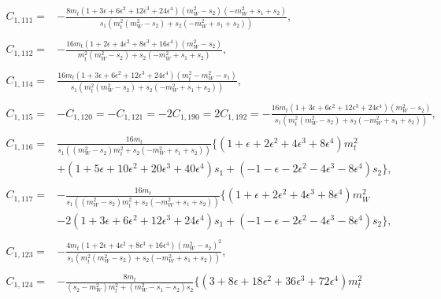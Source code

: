 \documentclass[twocolumn,aps,showpacs,nofootinbib,superscriptaddress,prd]{revtex4-2}
\begin{document}
\begin{widetext}
\begin{align}
\nonumber\\
C_{1,111}=&-\frac{8m_t\left(1 +3 \epsilon +6 \epsilon^2 +12 \epsilon^3 +24 \epsilon^4\right)\left(m_W^2-s_2\right)
\left(-m_W^2+s_1+s_2\right)}{s_1\left(m_t^2\left(m_W^2-s_2\right)+s_2\left(-m_W^2+s_1+s_2\right)\right)}
,\nonumber\\
\nonumber\\
C_{1,112}=&-\frac{16m_t\left(1 +2 \epsilon +4 \epsilon^2 +8 \epsilon^3 +16 \epsilon^4\right)\left(m_W^2-s_2\right)}{m_t^2
\left(m_W^2-s_2\right)+s_2\left(-m_W^2+s_1+s_2\right)}
,\nonumber\\
\nonumber\\
C_{1,114}=&\frac{16m_t\left(1 +3 \epsilon +6 \epsilon^2 +12 \epsilon^3 +24 \epsilon^4\right)\left(m_t^2-m_W^2-s_1\right)}{s_1\left(m_t^2
\left(m_W^2-s_2\right)+s_2\left(-m_W^2+s_1+s_2\right)\right)}
,\nonumber\\
\nonumber\\
C_{1,115}=&-C_{1,120}=-C_{1,121}=-2C_{1,190}=2C_{1,192}=-\frac{16m_t\left(1 +3 \epsilon +6 \epsilon^2 +12 \epsilon^3 +24 \epsilon^4\right)\left(m_W^2-s_2\right)}{s_1\left(m_t^2
\left(m_W^2-s_2\right)+s_2\left(-m_W^2+s_1+s_2\right)\right)}
,\nonumber\\
\nonumber\\
C_{1,116}=&\frac{16m_t}{s_1\left(\left(m_W^2-s_2\right)m_t^2+s_2\left(-m_W^2+s_1+s_2\right)\right)}\{\left(1 +\epsilon +2 \epsilon^2 +4 \epsilon^3 +8 \epsilon^4\right)m_t^2
\nonumber\\&
+\left(1 +5 \epsilon +10 \epsilon^2 +20 \epsilon^3 +40 \epsilon^4\right)s_1+\left(-1 -\epsilon -2 \epsilon^2 -4 \epsilon^3 -8 \epsilon^4\right)s_2\}
,\nonumber\\
\nonumber\\
C_{1,117}=&-\frac{16m_t}{s_1\left(\left(m_W^2-s_2\right)m_t^2+s_2\left(-m_W^2+s_1+s_2\right)\right)}\{\left(1 +\epsilon +2 \epsilon^2 +4 \epsilon^3 +8 \epsilon^4\right)m_W^2
\nonumber\\&
-2\left(1 +3 \epsilon +6 \epsilon^2 +12 \epsilon^3 +24 \epsilon^4\right)s_1+\left(-1 -\epsilon -2 \epsilon^2 -4 \epsilon^3 -8 \epsilon^4\right)s_2\}
,\nonumber\\
\nonumber\\
C_{1,123}=&-\frac{4m_t\left(1 +2 \epsilon +4 \epsilon^2 +8 \epsilon^3 +16 \epsilon^4\right)\left(m_W^2-s_2\right)^2}{s_1\left(m_t^2
\left(m_W^2-s_2\right)+s_2\left(-m_W^2+s_1+s_2\right)\right)}
,\nonumber\\
\nonumber\\
C_{1,124}=&-\frac{8m_t}{\left(s_2-m_W^2\right)m_t^2+\left(m_W^2-s_1-s_2\right)s_2}\{\left(3 +8 \epsilon +18 \epsilon^2 +36 \epsilon^3 +72 \epsilon^4\right)m_t^2

\end{align}
\end{widetext}
\end{document}
